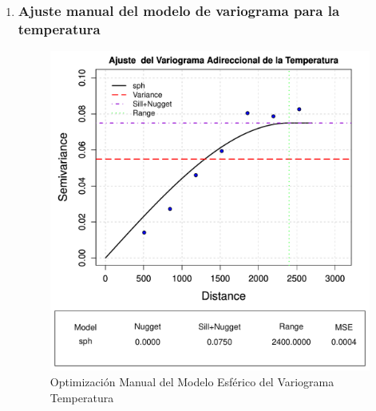 \begin{enumerate}

 \item \subsubsection{Ajuste manual del modelo de variograma para la temperatura}

 \begin{figure}[!htb]
     \centering
     \includegraphics[width=0.8\linewidth]{Figuras_AED//VARIOGRAFICO/temperatura_VarioEyeEstimation.pdf}
     \caption{Optimización Manual del Modelo Esférico del Variograma  Temperatura}

     \label{fig:enter-labelaq}
 \end{figure}


\end{enumerate}

